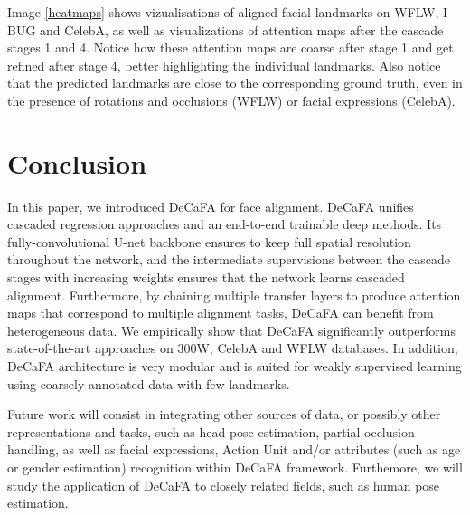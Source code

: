 \documentclass[10pt,twocolumn,letterpaper]{article}
\begin{document}
Image \ref{heatmaps} shows vizualisations of aligned facial landmarks on WFLW, I-BUG and CelebA, as well as visualizations of attention maps after the cascade stages 1 and 4. Notice how these attention maps are coarse after stage 1 and get refined after stage 4, better highlighting the individual landmarks. Also notice that the predicted landmarks are close to the corresponding ground truth, even in the presence of rotations and occlusions (WFLW) or facial expressions (CelebA).

\section{Conclusion}

In this paper, we introduced DeCaFA for face alignment. DeCaFA unifies cascaded regression approaches and an end-to-end trainable deep methods. Its fully-convolutional U-net backbone ensures to keep full spatial resolution throughout the network, and the intermediate supervisions between the cascade stages with increasing weights ensures that the network learns cascaded alignment. Furthermore, by chaining multiple transfer layers to produce attention maps that correspond to multiple alignment tasks, DeCaFA can benefit from heterogeneous data. We empirically show that DeCaFA significantly outperforms state-of-the-art approaches on 300W, CelebA and WFLW databases. In addition, DeCaFA architecture is very modular and is suited for weakly supervised learning using coarsely annotated data with few landmarks.

Future work will consist in integrating other sources of data, or possibly other representations and tasks, such as head pose estimation, partial occlusion handling, as well as facial expressions, Action Unit and/or attributes (such as age or gender estimation) recognition within DeCaFA framework. Furthemore, we will study the application of DeCaFA to closely related fields, such as human pose estimation.

{\small
	
	
}
\end{document}
